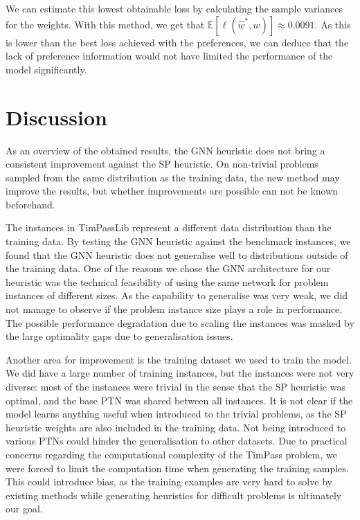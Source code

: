 \documentclass[english, 12pt, a4paper, sci, utf8, a-2b, online]{aaltothesis}
\begin{document}
We can estimate this lowest obtainable loss by calculating the sample variances for the weights. With this method, we get that $\mathbb{E}[\ell(\hat{w}^*, w)] \approx 0.0091$. As this is lower than the best loss achieved with the preferences, we can deduce that the lack of preference information would not have limited the performance of the model significantly.


\clearpage
\section{Discussion}
\label{sec:discussion}

As an overview of the obtained results, the GNN heuristic does not bring a consistent improvement against the SP heuristic. On non-trivial problems sampled from the same distribution as the training data, the new method may improve the results, but whether improvements are possible can not be known beforehand.

The instances in TimPassLib represent a different data distribution than the training data. By testing the GNN heuristic against the benchmark instances, we found that the GNN heuristic does not generalise well to distributions outside of the training data. One of the reasons we chose the GNN architecture for our heuristic was the technical feasibility of using the same network for problem instances of different sizes. As the capability to generalise was very weak, we did not manage to observe if the problem instance size plays a role in performance. The possible performance degradation due to scaling the instances was masked by the large optimality gaps due to generalisation issues.

Another area for improvement is the training dataset we used to train the model. We did have a large number of training instances, but the instances were not very diverse: most of the instances were trivial in the sense that the SP heuristic was optimal, and the base PTN was shared between all instances. It is not clear if the model learns anything useful when introduced to the trivial problems, as the SP heuristic weights are also included in the training data. Not being introduced to various PTNs could hinder the generalisation to other datasets. Due to practical concerns regarding the computational complexity of the TimPass problem, we were forced to limit the computation time when generating the training samples. This could introduce bias, as the training examples are very hard to solve by existing methods while generating heuristics for difficult problems is ultimately our goal.
\end{document}
